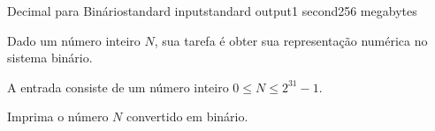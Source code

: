 \begin{problem}{Decimal para Binário}{standard input}{standard output}{1 second}{256 megabytes}

Dado um número inteiro $N$, sua tarefa é obter sua representação numérica no sistema binário.

\InputFile
A entrada consiste de um número inteiro $0 \leq N \leq 2^{31}-1$.

\OutputFile
Imprima o número $N$ convertido em binário.

\Examples

\begin{example}
%
%
%
%
\end{example}

\end{problem}

